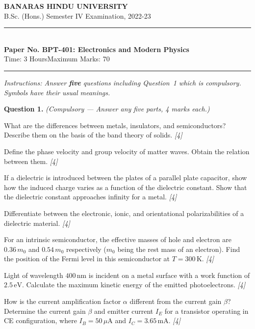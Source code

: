 \documentclass[11pt,a4paper]{article}
\newcommand{\pts}[1]{\hfill   \textit{[#1]}}
\begin{document}
\begin{center}
  {\large\bfseries BANARAS HINDU UNIVERSITY}\\[2pt]
  {\normalsize B.Sc. (Hons.) Semester IV Examination, 2022-23}\\[6pt]
  \rule{0.8\linewidth}{0.5pt}\\[6pt]
  {\large\bfseries Paper No. BPT-401: Electronics and Modern Physics}\\[4pt]
  {\normalsize Time: 3 Hours\hfill Maximum Marks: 70}
\end{center}
\rule{\linewidth}{0.4pt}
\smallskip



\noindent   \textit{Instructions: Answer   \textbf{five} questions including Question~1 which is compulsory. Symbols have their usual meanings.}

\medskip


\noindent   \textbf{Question 1.}   \textit{(Compulsory --- Answer any five parts, 4 marks each.)}

\begin{parts}
  \item What are the differences between metals, insulators, and semiconductors? Describe them on the basis of the band theory of solids. \pts{4}
  \item Define the phase velocity and group velocity of matter waves. Obtain the relation between them. \pts{4}
  \item If a dielectric is introduced between the plates of a parallel plate capacitor, show how the induced charge varies as a function of the dielectric constant. Show that the dielectric constant approaches infinity for a metal. \pts{4}
  \item Differentiate between the electronic, ionic, and orientational polarizabilities of a dielectric material. \pts{4}
  \item For an intrinsic semiconductor, the effective masses of hole and electron are $0.36\,m_0$ and $0.54\,m_0$ respectively ($m_0$ being the rest mass of an electron). Find the position of the Fermi level in this semiconductor at $T = 300\, \text{K}$. \pts{4}
  \item Light of wavelength $400\, \text{nm}$ is incident on a metal surface with a work function of $2.5\, \text{eV}$. Calculate the maximum kinetic energy of the emitted photoelectrons. \pts{4}
  \item How is the current amplification factor $\alpha$ different from the current gain $\beta$? Determine the current gain $\beta$ and emitter current $I_E$ for a transistor operating in CE configuration, where $I_B = 50\,\mu \text{A}$ and $I_C = 3.65\, \text{mA}$. \pts{4}
\end{parts}
\end{document}
